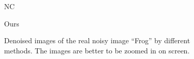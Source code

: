 \begin{figure}
{\begin{minipage}[t]{0.19\textwidth}
{\footnotesize NC}
\end{minipage}
\begin{minipage}[t]{0.19\textwidth}
\centering
{}
{\footnotesize Ours}
\end{minipage}
}
\caption{Denoised images of the real noisy image ``Frog'' \cite{ncwebsite} by different methods. The images are better to be zoomed in on screen.}
    \label{fig3-10}
\end{figure}

